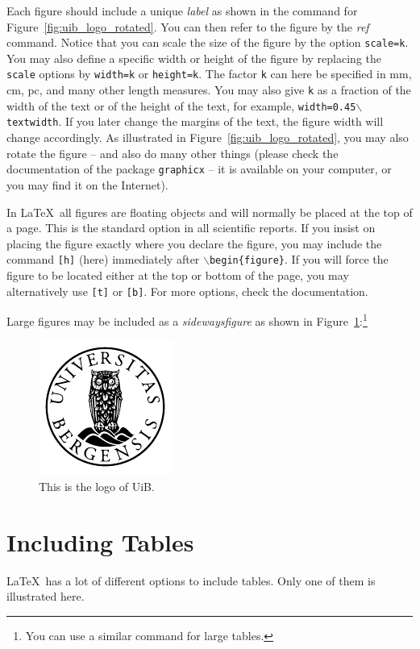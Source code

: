 \documentclass[../Main/thesis.tex]{subfiles}
\begin{document}
Each figure should include a unique \emph{label} as shown in the command for Figure~\ref{fig:uib_logo_rotated}. 
You can then refer to the figure by the \emph{ref} command.
Notice that you can scale the size of the figure by the option \texttt{scale=k}. 
You may also define a specific width or height of the figure by replacing the \texttt{scale} options by \texttt{width=k} or \texttt{height=k}. 
The factor \texttt{k} can here be specified in mm, cm, pc, and many other length measures. 
You may also give \texttt{k} as a fraction of the width of the text or of the height of the text, for example, \texttt{width=0.45$\backslash$textwidth}. 
If you later change the margins of the text, the figure width will change accordingly. 
As illustrated in Figure~\ref{fig:uib_logo_rotated}, you may also rotate the figure -- and also do many other things (please check the documentation of the package \texttt{graphicx} -- it is available on your computer, or you may find it on the Internet).

In \LaTeX\ all figures are floating objects and will normally be placed at the top of a page. 
This is the standard option in all scientific reports. 
If you insist on placing the figure exactly where you declare the figure, you may include the command \texttt{[h]} (here) immediately after $\backslash$\texttt{begin\{figure\}}. 
If you will force the figure to be located either at the top or bottom of the page, you may alternatively use  \texttt{[t]} or \texttt{[b]}. 
For more options, check the documentation.

Large figures may be included as a \emph{sidewaysfigure} as shown in Figure~\ref{fig:uib_logo}:\footnote{You can use a similar command for large tables.}
\begin{figure}
\centering
\includegraphics[scale=1.8]{../Figures/uib}
\caption{This is the logo of UiB.}
\label{fig:uib_logo}
\end{figure}

\section{Including Tables}
\label{sec:including_tables}
\LaTeX\ has a lot of different options to include tables. 
Only one of them is illustrated here.
\end{document}
